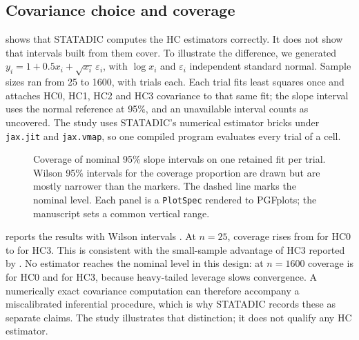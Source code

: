 \subsection{Covariance choice and coverage}\label{sec:coverage}

 shows that STATADIC computes the HC estimators correctly. It
does not show that intervals built from them cover. To illustrate the
difference, we generated $y_i = 1 + 0.5 x_i + \sqrt{x_i}\,\varepsilon_i$, with
$\log x_i$ and $\varepsilon_i$ independent standard normal. Sample sizes ran
from 25 to 1600, with  trials each. Each trial fits least
squares once and attaches HC0, HC1, HC2 and HC3 covariance to that same fit;
the slope interval uses the normal reference at 95\%, and an unavailable
interval counts as uncovered. The study uses STATADIC's numerical estimator bricks
under \texttt{jax.jit} and \texttt{jax.vmap}, so one compiled program evaluates
every trial of a cell.

\begin{figure}[t]
  \centering
  \hfill

  \medskip
  \hfill
  \caption{Coverage of nominal 95\% slope intervals on one retained fit per
    trial. Wilson 95\% intervals for the coverage proportion are drawn but are
    mostly narrower than the markers. The dashed line marks the nominal
    level. Each panel is a \texttt{PlotSpec} rendered
  to PGFplots; the manuscript sets a common vertical range.}
  \label{fig:coverage}
\end{figure}

 reports the results with Wilson intervals
\citep{wilson-1927}. At $n = 25$, coverage rises from
 for HC0 to  for HC3. This is
consistent with the small-sample advantage of HC3 reported by
\citet{long-ervin-2000}. No estimator reaches the nominal level in this design:
at $n = 1600$ coverage is  for HC0 and
 for HC3, because heavy-tailed leverage slows
convergence. A numerically exact covariance computation can therefore
accompany a miscalibrated inferential procedure, which is why STATADIC records
these as separate claims. The study illustrates that distinction; it does not
qualify any HC estimator.


